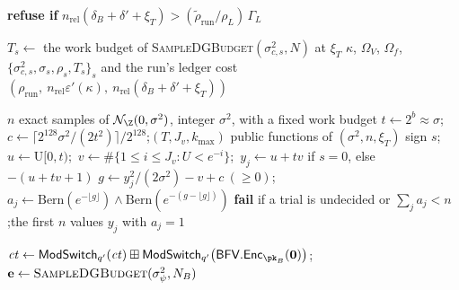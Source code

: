 \textbf{refuse if} $n_{\mathrm{rel}}(\delta_B+\delta'+\xi_T)>(\tilde\rho_{\mathrm{run}}/\rho_L)\,\Gamma_L$

  \State $T_s\gets$ the work budget of \textsc{SampleDGBudget}$(\sigma_{c,s}^2,N)$ at $\xi_T$ 
  \State \Return $\kappa$, $\Omega_V$, $\Omega_f$, $\{\sigma_{c,s}^2,\sigma_s,\rho_s,T_s\}_s$ and the run's ledger cost $(\rho_{\mathrm{run}},\ n_{\mathrm{rel}}\varepsilon'(\kappa),\ n_{\mathrm{rel}}(\delta_B+\delta'+\xi_T))$

 $n$ exact samples of $\mathcal N_{\Z}(0,\sigma^2)$, integer $\sigma^2$, with a fixed work budget
  \State $t\gets2^b\approx\sigma$;\quad $c\gets\lceil2^{128}\sigma^2/(2t^2)\rceil/2^{128}$;\quad $(T,J_v,k_{\max})$ public functions of $(\sigma^2,n,\xi_T)$
   
    \State sign $s$;\ $u\gets\mathrm U[0,t)$;\ $v\gets\#\{1\le i\le J_v:U<e^{-i}\}$;\ $y_j\gets u+tv$ if $s=0$, else $-(u+tv+1)$
    \State $g\gets y_j^2/(2\sigma^2)-v+c\ (\ge0)$;\quad $a_j\gets\mathrm{Bern}(e^{-\lfloor g\rfloor})\wedge\mathrm{Bern}(e^{-(g-\lfloor g\rfloor)})$ 
  \EndFor
  \State \textbf{fail} if a trial is undecided or $\sum_ja_j<n$;\quad \Return the first $n$ values $y_j$ with $a_j=1$ 
\EndFunction

  \State $\mathit{ct}\gets\mathsf{ModSwitch}_{q'}(\mathit{ct})\boxplus\mathsf{ModSwitch}_{q'}\bigl(\mathsf{BFV.Enc}_{\pk_B}(\mathbf 0)\bigr)$;\quad $\mathbf e\gets\textsc{SampleDGBudget}(\sigma_\psi^2,N_B)$ 
